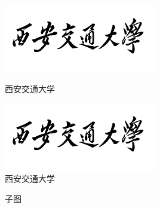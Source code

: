 \documentclass[
    doctor,
    pdflinks,
    ]{xjtuthesis}
\begin{document}
            \begin{figure}[h!]
              \begin{minipage}{0.45\textwidth}
                  \centering
                  \includegraphics[width=6.67cm]{XJTU.pdf}
                  \caption{西安交通大学}
                  \label{fig:xjtu-left}
              \end{minipage}
              \begin{minipage}{0.45\textwidth}
                  \centering
                  \includegraphics[width=6.67cm]{XJTU.pdf}
                  \caption{西安交通大学}
                  \label{fig:xjtu-right}
              \end{minipage}
            \end{figure}
              
            \begin{figure}[h!]
              \centering
              \caption{子图}
            \end{figure}
              
\end{document}
